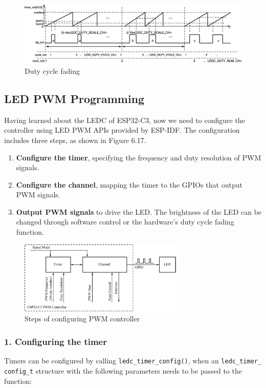 \documentclass[a4paper,12pt,openany]{book}
\begin{document}
\begin{figure}[h!]
    \centering
    \includegraphics[width=\textwidth]{D6Z/6-16}
    \caption{Duty cycle fading}
\end{figure}

\subsection{LED PWM Programming}
Having learned about the LEDC of ESP32-C3, now we need to configure the controller using LED PWM APIs provided by ESP-IDF. The configuration includes three steps, as shown in Figure 6.17.

\begin{enumerate}[label=\arabic*.,noitemsep]
    \item \textbf{Configure the timer}, specifying the frequency and duty resolution of PWM signals.
    \item \textbf{Configure the channel}, mapping the timer to the GPIOs that output PWM signals.
    \item \textbf{Output PWM signals} to drive the LED. The brightness of the LED can be changed through software control or the hardware’s duty cycle fading function.
\end{enumerate}

\begin{figure}[h!]
    \centering
    \includegraphics[width=0.7\textwidth]{D6Z/6-17}
    \caption{Steps of configuring PWM controller}
\end{figure}

\subsubsection{1. Configuring the timer}
Timers can be configured by calling \verb|ledc_timer_config()|, when an \verb|ledc_timer_|\\ \verb|config_t| structure with the following parameters needs to be passed to the function:
\end{document}
